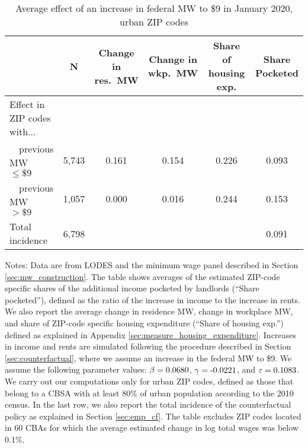 \begin{table}[hbt!]
    \centering
    \caption{Average effect of an increase in federal MW to \$9 in January 2020, urban ZIP codes}
    \label{tab:counterfactuals_fed_9usd}

    \begin{tabular}{@{}lccccc@{}}
        \toprule
                         & N & \shortstack{Change in\\res.\ MW}
                             & \shortstack{Change in\\wkp.\ MW}
                             & \shortstack{Share of\\housing exp.}  
                             & \shortstack{Share\\Pocketed}                      \\ \midrule
        Effect in ZIP codes with...          &      &       &       &     &      \\
        $\quad$previous MW $\leq\$9\quad$    & 5,743 &  0.161 & 0.154  & 0.226 &  0.093   \\
        $\quad$previous MW $>\$9\quad$       & 1,057 &  0.000 & 0.016  & 0.244 & 0.153    \\ 
        Total incidence                      & 6,798 &      &      &     & 0.091    \\ \bottomrule
    \end{tabular}
    
    \begin{minipage}{.95\textwidth} \footnotesize
        \vspace{2mm}
        Notes: 
        Data are from LODES and the minimum wage panel described in Section 
        \ref{sec:mw_construction}.
        The table shows averages of the estimated ZIP-code specific shares of the 
        additional income pocketed by landlords (``Share pocketed''), 
        defined as the ratio of the increase in income to the increase in rents. 
        We also report the average change in residence MW, change in workplace MW,
        and share of ZIP-code specific housing expenditure 
        (``Share of housing exp.'') defined as explained in Appendix \ref{sec:measure_housing_expenditure}.
        Increases in income and rents are simulated following the procedure 
        described in Section \ref{sec:counterfactual},
        where we assume an increase in the federal MW to \$9.
        We assume the following parameter values: 
        $\beta = \textnormal{0.0680}$, $\gamma = \textnormal{-0.0221}$, 
        and $\varepsilon = \textnormal{0.1083}$.
        We carry out our computations only for urban ZIP codes, defined as 
        those that belong to a CBSA with at least 80\% of urban population
        according to the 2010 census.
        In the last row, we also report the total incidence of the counterfactual policy
        as explained in Section \ref{sec:emp_cf}.
        The table excludes ZIP codes located in 60 CBAs for which the average
        estimated change in log total wages was below 0.1\%.
    \end{minipage}
\end{table}


